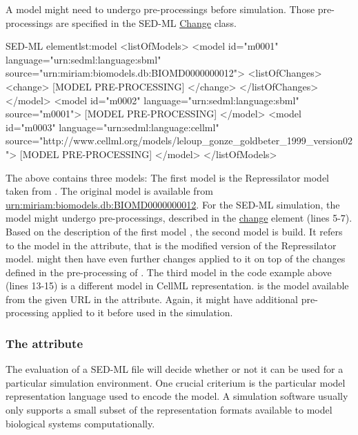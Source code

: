 A model might need to undergo pre-processings before simulation. Those pre-processings are specified in the SED-ML \hyperref[class:change]{Change} class.

%
\begin{myXmlLst}{SED-ML  element}{lst:model}
<listOfModels>
 <model id="m0001" language="urn:sedml:language:sbml" 
  source="urn:miriam:biomodels.db:BIOMD0000000012">
  <listOfChanges>
   <change>
    [MODEL PRE-PROCESSING]
   </change>
   </listOfChanges> 
 </model>
 <model id="m0002" language="urn:sedml:language:sbml" source="m0001">
  [MODEL PRE-PROCESSING]
 </model>
 <model id="m0003" language="urn:sedml:language:cellml" source="http://www.cellml.org/models/leloup_gonze_goldbeter_1999_version02">
  [MODEL PRE-PROCESSING]
 </model>
</listOfModels>
\end{myXmlLst} 
%

The above  contains three models: 
The first model  is the Repressilator model taken from \biom. 
The original model is available from \url{urn:miriam:biomodels.db:BIOMD0000000012}. 
For the SED-ML simulation, the model might undergo pre-processings, described in the \hyperref[class:change]{change} element (lines 5-7).
Based on the description of the first model , the second model is build. 
It refers to the model  in the  attribute, that is the modified version of the Repressilator model.
 might then have even further changes applied to it on top of the changes defined in the pre-processing of .
The third model in the code example above (lines 13-15) is a different model in CellML representation.  is the model available from the given URL in the  attribute. Again, it might have additional pre-processing applied to it before used in the simulation.


\subsubsection{The  attribute}
\label{sec:language}
The evaluation of a SED-ML file will decide whether or not it can be used for a particular simulation environment. One crucial criterium is the particular model representation language used to encode the model. A simulation software usually only supports a small subset of the representation formats available to model biological systems computationally. 


